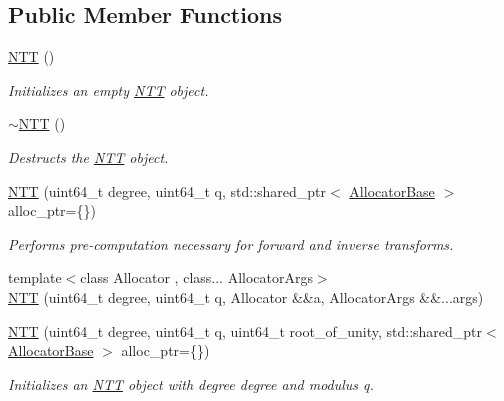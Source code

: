 \subsection*{Public Member Functions}
\begin{DoxyCompactItemize}
\item 
\hyperlink{classhetest_1_1utils_1_1NTT_a3babb9b273fca5c7a7b8c782341e57c0}{N\-T\-T} ()
\begin{DoxyCompactList}\small\item\em Initializes an empty \hyperlink{classhetest_1_1utils_1_1NTT}{N\-T\-T} object. \end{DoxyCompactList}\item 
\hyperlink{classhetest_1_1utils_1_1NTT_af1677329c3f6051d20cf6ce6b28e6c94}{$\sim$\-N\-T\-T} ()
\begin{DoxyCompactList}\small\item\em Destructs the \hyperlink{classhetest_1_1utils_1_1NTT}{N\-T\-T} object. \end{DoxyCompactList}\item 
\hyperlink{classhetest_1_1utils_1_1NTT_a5a974237b1ea73b6e08b33e99356293f}{N\-T\-T} (uint64\-\_\-t degree, uint64\-\_\-t q, std\-::shared\-\_\-ptr$<$ \hyperlink{structhetest_1_1utils_1_1AllocatorBase}{Allocator\-Base} $>$ alloc\-\_\-ptr=\{\})
\begin{DoxyCompactList}\small\item\em Performs pre-\/computation necessary for forward and inverse transforms. \end{DoxyCompactList}\item 
{\footnotesize template$<$class Allocator , class... Allocator\-Args$>$ }\\\hyperlink{classhetest_1_1utils_1_1NTT_a4735b3c9e5f15f9ec0d474a0342b046d}{N\-T\-T} (uint64\-\_\-t degree, uint64\-\_\-t q, Allocator \&\&a, Allocator\-Args \&\&...args)
\item 
\hyperlink{classhetest_1_1utils_1_1NTT_a4f41af61203de2aa28e0d380b5b04ae4}{N\-T\-T} (uint64\-\_\-t degree, uint64\-\_\-t q, uint64\-\_\-t root\-\_\-of\-\_\-unity, std\-::shared\-\_\-ptr$<$ \hyperlink{structhetest_1_1utils_1_1AllocatorBase}{Allocator\-Base} $>$ alloc\-\_\-ptr=\{\})
\begin{DoxyCompactList}\small\item\em Initializes an \hyperlink{classhetest_1_1utils_1_1NTT}{N\-T\-T} object with degree {\ttfamily degree} and modulus {\ttfamily q}. \end{DoxyCompactList}\item 

\end{DoxyCompactItemize}
